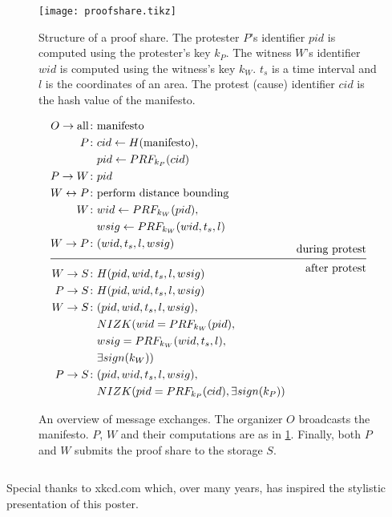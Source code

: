 \begin{columns}[t]
  \hfill

  \begin{column}{0.32\linewidth}
    \begin{figure}
      \centering
      \texttt{[image: proofshare.tikz]}
      \caption{%
        Structure of a proof share.
        The protester \(P\)'s identifier \(pid\) is computed using the protester's 
        key \(k_P\).
        The witness \(W\)'s identifier \(wid\) is computed using the witness's key 
        \(k_W\).
        \(t_s\) is a time interval and \(l\) is the coordinates of an area.
        The protest (cause) identifier \(cid\) is the hash value of the manifesto.
      }%
      \label{ProofShare}
    \end{figure}%

    \begin{figure}
      \centering
      \begin{minipage}{\linewidth}
        \begin{align*}
          O\to \text{all}\colon & \text{manifesto} \\
          P\colon & cid\gets H(\text{manifesto}), \\
          & pid\gets PRF_{k_P}(cid) \\
          P\to W\colon & pid \\
          W\leftrightarrow P\colon & \text{perform distance bounding} \\
          W\colon & wid\gets PRF_{k_W}(pid), \\
          & wsig\gets PRF_{k_W}(wid, t_s, l) \\
          W\to P\colon & (wid, t_s, l, wsig) \\[-1em]
          && \text{during protest} \\ \midrule && \text{after protest} \\[-1em]
          W\to S\colon & H(pid, wid, t_s, l, wsig) \\
          P\to S\colon & H(pid, wid, t_s, l, wsig) \\
          W\to S\colon & (pid, wid, t_s, l, wsig),\\
          & NIZK( wid = PRF_{k_W}(pid), \\
          & wsig = PRF_{k_W}(wid, t_s, l), \\
          & \exists sign(k_W)) \\
          P\to S\colon & (pid, wid, t_s, l, wsig),\\
          & NIZK(pid = PRF_{k_P}(cid), \exists sign(k_P))
        \end{align*}
      \end{minipage}
      \caption{%
        An overview of message exchanges.
        The organizer \(O\) broadcasts the manifesto.
        \(P\), \(W\) and their computations are as in \cref{ProofShare}.
        Finally, both \(P\) and \(W\) submits the proof share to the storage \(S\).
      }%
      \label{Protocol}
    \end{figure}

  \end{column}

\end{columns}

\vfill
\flushright{}
Special thanks to xkcd.com which, over many years, has inspired the stylistic 
presentation of this poster.
